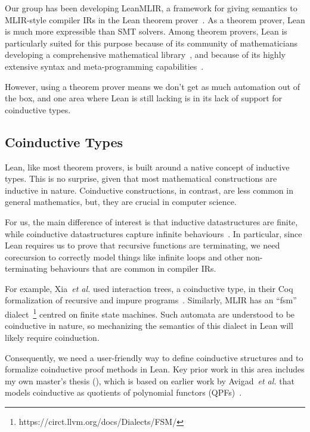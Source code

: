 \documentclass[a4paper]{scrartcl}
\newcommand*{\etal}{~\emph{et al.}}
\begin{document}
Our group has been developing
LeanMLIR, a framework for giving
semantics to MLIR-style compiler IRs in the Lean theorem prover~\cite{demouraLeanTheoremProver2015}. 
As a theorem prover, Lean is
much more expressible than SMT solvers. Among theorem provers, Lean is
particularly suited for this purpose because of its community of
mathematicians developing a comprehensive mathematical library~\cite{themathlibcommunityLeanMathematicalLibrary2020},
and because of its highly extensive syntax and meta-programming capabilities~\cite{ullrichNotationsHygienicMacro2022, paulinoMetaprogrammingLean}.

However, using a theorem prover means we don't get as much automation
out of the box, and one area where Lean is still lacking is in its lack
of support for coinductive types.


\subsection{Coinductive Types}\label{coinductive-types}

Lean, like most theorem provers, is built around a native concept
of inductive types. This is no surprise, given that most mathematical
constructions are inductive in nature. Coinductive constructions, in
contrast, are less common in general mathematics, but, they are crucial
in computer science.

For us, the main difference of interest is that inductive datastructures
are finite, while coinductive datastructures capture infinite
behaviours~\cite{sangiorgiIntroductionBisimulationCoinduction2011}.
In particular, since Lean requires us to prove that recursive functions are
terminating, we need corecursion to correctly model things like infinite
loops and other non-terminating behaviours that are common in compiler
IRs.

For example, Xia\etal{} used interaction trees, a coinductive type, in
their Coq formalization of recursive and impure programs~\cite{xiaInteractionTreesRepresenting2020}.
Similarly, MLIR has an
``fsm'' dialect~\footnote{https://circt.llvm.org/docs/Dialects/FSM/}
centred on finite state machines. Such automata are understood to be
coinductive in nature, so mechanizing the semantics of this dialect in
Lean will likely require coinduction.

Consequently, we need a user-friendly way to define coinductive
structures and to formalize coinductive proof methods in Lean. Key prior
work in this area includes my own master's thesis (\cite{keizerImplementingDefinitionalCo}), 
which is based on earlier
work by Avigad\etal{} that models coinductive as quotients of polynomial
functors (QPFs)~\cite{avigadDataTypesQuotients2019}.
\end{document}
